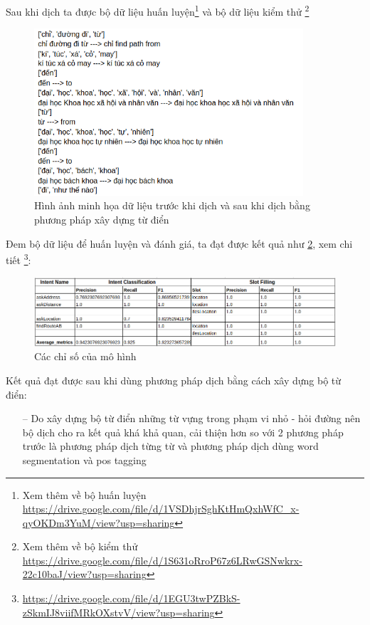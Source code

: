 Sau khi dịch ta được bộ dữ liệu huấn luyện\footnote{Xem thêm về bộ huấn luyện \url{https://drive.google.com/file/d/1VSDhjrSghKtHmQxhWfC_x-qyOKDm3YuM/view?usp=sharing}} và bộ dữ liệu kiểm thử \footnote{Xem thêm về bộ kiểm thử \url{https://drive.google.com/file/d/1S631oRroP67z6LRwGSNwkrx-22c10baJ/view?usp=sharing}}
\begin{figure}[htp]
    \centering
    \includegraphics[width=10cm]{images/trainingdata-tudien.png}
    \caption{Hình ảnh minh họa dữ liệu trước khi dịch và sau khi dịch bằng phương pháp xây dựng từ điển}
    \label{fig:trainingdata-tudien}

\end{figure}

Đem bộ dữ liệu để huấn luyện và đánh giá, ta đạt được kết quả như \ref{fig:metrics-dict-ex}, xem chi tiết \footnote{\url{https://drive.google.com/file/d/1EGU3twPZBkS-zSkmIJ8viifMRkOXstvV/view?usp=sharing}}:

\begin{figure}[htp]
    \centering
    \includegraphics[width=15cm]{images/metrics-dict}
    \caption{Các chỉ số của mô hình}
    \label{fig:metrics-dict-ex}
\end{figure}
Kết quả đạt được sau khi dùng phương pháp dịch bằng cách xây dựng bộ từ điển:
\begin{itemize}
    \item[--] Do xây dựng bộ từ điển những từ vựng trong phạm vi nhỏ - hỏi đường nên bộ dịch cho ra kết quả khá khả quan, cải thiện hơn so với 2 phương pháp trước là phương pháp dịch từng từ và phương pháp dịch dùng word segmentation và pos tagging
\end{itemize}

